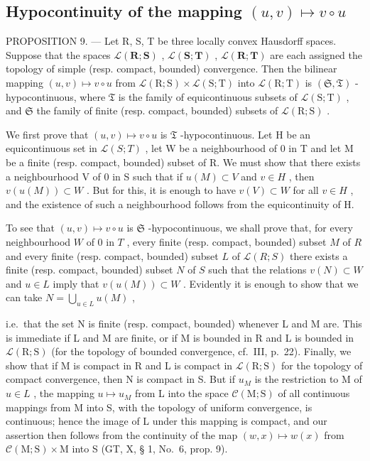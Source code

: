 \subsection{\texorpdfstring{Hypocontinuity of the mapping \((u, v) \mapsto v \circ u\)}{Hypocontinuity of the mapping (u, v) \textbackslash mapsto v \textbackslash circ u}}

PROPOSITION 9. --- Let R, S, T be three locally convex Hausdorff spaces. Suppose that the spaces \(\mathcal{L}(\mathbf{R};\mathbf{S})\) , \(\mathcal{L}(\mathbf{S};\mathbf{T})\) , \(\mathcal{L}(\mathbf{R};\mathbf{T})\) are each assigned the topology of simple (resp. compact, bounded) convergence. Then the bilinear mapping \((u, v) \mapsto v \circ u\) from \(\mathcal{L}(\mathrm{R}; \mathrm{S}) \times \mathcal{L}(\mathrm{S}; \mathrm{T})\) into \(\mathcal{L}(\mathrm{R}; \mathrm{T})\) is \((\mathfrak{S}, \mathfrak{T})\) -hypocontinuous, where \(\mathfrak{T}\) is the family of equicontinuous subsets of \(\mathcal{L}(\mathrm{S}; \mathrm{T})\) , and \(\mathfrak{S}\) the family of finite (resp. compact, bounded) subsets of \(\mathcal{L}(\mathrm{R}; \mathrm{S})\) .

We first prove that \((u, v) \mapsto v \circ u\) is \(\mathfrak{T}\) -hypocontinuous. Let H be an equicontinuous set in \(\mathcal{L}(S; T)\) , let W be a neighbourhood of 0 in T and let M be a finite (resp. compact, bounded) subset of R. We must show that there exists a neighbourhood V of 0 in S such that if \(u(M) \subset V\) and \(v \in H\) , then \(v(u(M)) \subset W\) . But for this, it is enough to have \(v(V) \subset W\) for all \(v \in H\) , and the existence of such a neighbourhood follows from the equicontinuity of H.

To see that \((u, v) \mapsto v \circ u\) is \(\mathfrak{S}\) -hypocontinuous, we shall prove that, for every neighbourhood \(W\) of 0 in \(T\) , every finite (resp. compact, bounded) subset \(M\) of \(R\) and every finite (resp. compact, bounded) subset \(L\) of \(\mathcal{L}(R; S)\) there exists a finite (resp. compact, bounded) subset \(N\) of \(S\) such that the relations \(v(N) \subset W\) and \(u \in L\) imply that \(v(u(M)) \subset W\) . Evidently it is enough to show that we can take \(N = \bigcup_{u \in L} u(M)\) ,

i.e.~that the set N is finite (resp. compact, bounded) whenever L and M are. This is immediate if L and M are finite, or if M is bounded in R and L is bounded in \(\mathcal{L}(\mathrm{R};\mathrm{S})\) (for the topology of bounded convergence, cf.~III, p.~22). Finally, we show that if M is compact in R and L is compact in \(\mathcal{L}(\mathrm{R};\mathrm{S})\) for the topology of compact convergence, then N is compact in S. But if \(u_{M}\) is the restriction to M of \(u \in L\) , the mapping \(u \mapsto u_{M}\) from L into the space \(\mathcal{C}(\mathrm{M};\mathrm{S})\) of all continuous mappings from M into S, with the topology of uniform convergence, is continuous; hence the image of L under this mapping is compact, and our assertion then follows from the continuity of the map \((w,x) \mapsto w(x)\) from \(\mathcal{C}(\mathrm{M};\mathrm{S}) \times \mathrm{M}\) into S (GT, X, § 1, No.~6, prop. 9).


